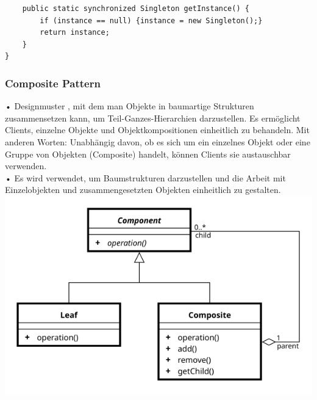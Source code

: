 \documentclass{article}
\begin{document}
\begin{enumerate}[label=\alph*)]
\begin{lstlisting}
    public static synchronized Singleton getInstance() {
        if (instance == null) {instance = new Singleton();}
        return instance;
    }
}
   \end{lstlisting}
  
   \subsubsection*{Composite Pattern}
   • Designmuster , mit dem man Objekte in baumartige Strukturen zusammensetzen kann, um Teil-Ganzes-Hierarchien darzustellen. Es ermöglicht Clients, einzelne Objekte und Objektkompositionen einheitlich zu behandeln. Mit anderen Worten: Unabhängig davon, ob es sich um ein einzelnes Objekt oder eine Gruppe von Objekten (Composite) handelt, können Clients sie austauschbar verwenden.\\
   • Es wird verwendet, um Baumstrukturen darzustellen und die Arbeit mit Einzelobjekten und zusammengesetzten Objekten einheitlich zu gestalten.\\
   \includegraphics[scale=0.4]{media/compositePattern.png}
   
   

\end{enumerate}
\end{document}
